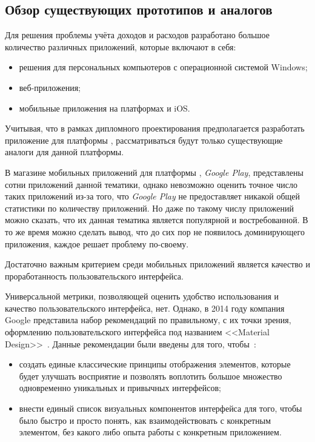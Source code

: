 \subsection{Обзор существующих прототипов и аналогов}
\label{sec:analysis:analogues}

Для решения проблемы учёта доходов и расходов разработано большое количество различных приложений, которые включают в себя:
\begin{itemize}
    \item решения для персональных компьютеров с операционной системой Windows;
    \item веб-приложения;
    \item мобильные приложения на платформах \andro и iOS\@.
\end{itemize}

Учитывая, что в рамках дипломного проектирования предполагается разработать приложение для платформы \andro, рассматриваться будут только существующие аналоги для данной платформы.

В магазине мобильных приложений для платформы \andro, \emph{Google Play}, представлены сотни приложений данной тематики, однако невозможно оценить точное число таких приложений из-за того, что \emph{Google Play} не предоставляет никакой общей статистики по количеству приложений.
Но даже по такому числу приложений можно сказать, что их данная тематика является популярной и востребованной.
В то же время можно сделать вывод, что до сих пор не появилось доминирующего приложения, каждое решает проблему по-своему.

Достаточно важным критерием среди мобильных приложений является качество и проработанность пользовательского интерфейса.

Универсальной метрики, позволяющей оценить удобство использования и качество пользовательского интерфейса, нет.
Однако, в 2014 году компания Google представила набор рекомендаций по правильному, с их точки зрения, оформлению пользовательского интерфейса под названием <<Material Design>>~\cite{google_material_news}.
Данные рекомендации были введены для того, чтобы~\cite{google_material_guidelines}:
\begin{itemize}
    \item создать единые классические принципы отображения элементов, которые будет улучшать восприятие и позволять воплотить большое множество одновременно уникальных и привычных интерфейсов;
    \item внести единый список визуальных компонентов интерфейса для того, чтобы было быстро и просто понять, как взаимодействовать с конкретным элементом, без какого либо опыта работы с конкретным приложением.
\end{itemize}

